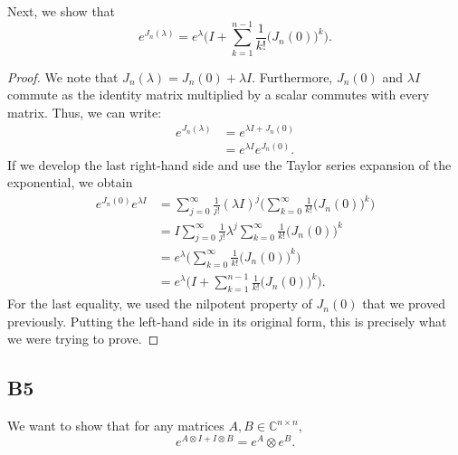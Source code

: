 \documentclass[11pt]{article}
\newcommand{\complex}{\mathbb{C}} %
\newcommand{\kp}{\otimes} %
\begin{document}
Next, we show that
\[
    e^{J_n(\lambda)}=e^{\lambda}\Bigg(I+\sum_{k=1}^{n-1}\frac{1}{k!}\big(J_n(0)\big)^k\Bigg).
\]
\begin{proof}
We note that $J_n(\lambda)=J_n(0)+\lambda I$.
Furthermore, $J_n(0)$ and $\lambda I$ commute as the identity matrix multiplied by a scalar commutes with every matrix.
Thus, we can write:
\begin{align*}
    e^{J_n(\lambda)}&=e^{\lambda I+J_n(0)}\\
    &=e^{\lambda I}e^{J_n(0)}.
\end{align*}
If we develop the last right-hand side and use the Taylor series expansion of the exponential, we obtain
\begin{align*}
    e^{J_n(0)}e^{\lambda I}&=\sum_{j=0}^{\infty}\frac{1}{j!}(\lambda I)^j\Bigg(\sum_{k=0}^{\infty}\frac{1}{k!}\big(J_n(0)\big)^k\Bigg)\\
    &=I\sum_{j=0}^{\infty}\frac{1}{j!}\lambda ^j\sum_{k=0}^{\infty}\frac{1}{k!}\big(J_n(0)\big)^k\\
    &=e^{\lambda}\Bigg(\sum_{k=0}^{\infty}\frac{1}{k!}\big(J_n(0)\big)^k\Bigg)\\
    &=e^{\lambda}\Bigg(I+\sum_{k=1}^{n-1}\frac{1}{k!}\big(J_n(0)\big)^k\Bigg).
\end{align*}
For the last equality, we used the nilpotent property of $J_n(0)$ that we proved previously.
Putting the left-hand side in its original form, this is precisely what we were trying to prove.
\end{proof}

\subsection*{B5}
We want to show that for any matrices \(A, B \in \complex^{n \times n}\),
\[
    e^{A\kp I+I\kp B}=e^A\kp e^B.
\]
\end{document}
